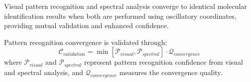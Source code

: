 \begin{theorem}
Visual pattern recognition and spectral analysis converge to identical molecular identification results when both are performed using oscillatory coordinates, providing mutual validation and enhanced confidence.
\end{theorem}

\begin{definition}
Pattern recognition convergence is validated through:
$$\mathcal{C}_{validation} = \min[\mathcal{P}_{visual}, \mathcal{P}_{spectral}] \cdot \mathcal{Q}_{convergence}$$
where $\mathcal{P}_{visual}$ and $\mathcal{P}_{spectral}$ represent pattern recognition confidence from visual and spectral analysis, and $\mathcal{Q}_{convergence}$ measures the convergence quality.
\end{definition}
